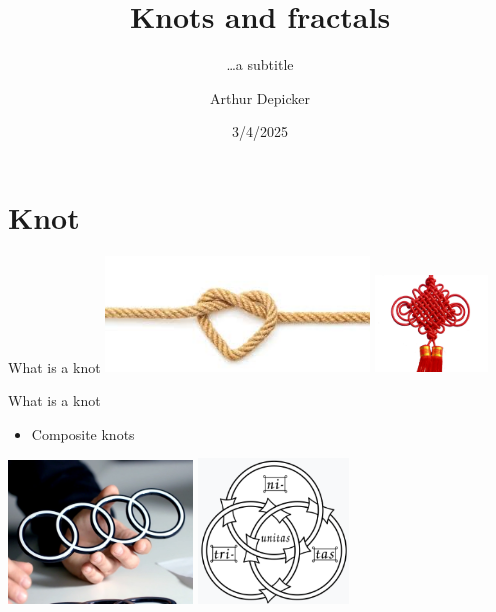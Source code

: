 \documentclass[]{beamer}
\title[Main title]{Knots and fractals}
\subtitle{\ldots a subtitle}
\author[A.\ Depicker]{Arthur Depicker} %
\date{3/4/2025} %
\institute[KU Leuven]{Faculty of Science\\ Department of Earth and Environmental Sciences}
\begin{document}
	{
		\maketitle
	}
	\addtocounter{framenumber}{-1} %

\section{Knot}
\begin{frame}{What is a knot}
\centering
\includegraphics[width=7cm]{Pictures/images.jpg}
\includegraphics[width=3cm]{Pictures/chineseknot.png}

\end{frame}

\begin{frame}{What is a knot}
    \begin{itemize}
        \item Composite knots
    \end{itemize}
\centering
\includegraphics[width = 4.9cm]{Pictures/audi.jpg}
\includegraphics[width = 4cm]{Pictures/borromean.png}

\end{frame}
\end{document}
